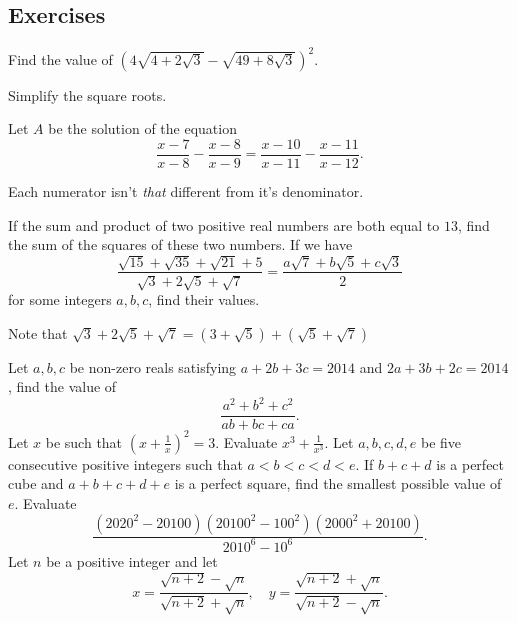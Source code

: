 \documentclass[../jarvis.tex]{subfiles}
\begin{document}
\subsection{Exercises}
\problem[2015 SMO(J) P9]Find the value of $\left(4\sqrt{4+2\sqrt{3}}-\sqrt{49+8\sqrt{3}}\right)^2.$
\begin{hints}
    \begin{hint}
        Simplify the square roots.
    \end{hint}
\end{hints}
\problem[2014 SMO(J) P13]Let $A$ be the solution of the equation
$$\frac{x-7}{x-8}-\frac{x-8}{x-9}=\frac{x-10}{x-11}-\frac{x-11}{x-12}.$$
\begin{hints}
    \begin{hint}
        Each numerator isn't \textit{that} different from it's denominator.
    \end{hint}
\end{hints}
\problem[2016 SMO(J) P11]If the sum and product of two positive real numbers are both equal to $13$, find the sum of the squares of these two numbers.
\problem[2022 SMO(J) P22]If we have $$\frac{\sqrt{15}+\sqrt{35}+\sqrt{21}+5}{\sqrt{3}+2\sqrt{5}+\sqrt{7}}=\frac{a\sqrt{7}+b\sqrt{5}+c\sqrt{3}}{2}$$ for some integers $a,b,c$, find their values.
\begin{hints}
    \begin{hint}
        Note that $\sqrt{3}+2\sqrt{5}+\sqrt{7}=(3+\sqrt{5})+(\sqrt{5}+\sqrt{7})$
    \end{hint}
\end{hints}
\problem[2014 SMO(J) P23]Let $a,b,c$ be non-zero reals satisfying $a+2b+3c=2014$ and $2a+3b+2c=2014$, find the value of 
$$\frac{a^2+b^2+c^2}{ab+bc+ca}.$$
\problem[2014 SMO(J) P26]Let $x$ be such that $\left(x+\frac{1}{x}\right)^2=3$. Evaluate $x^3+\frac{1}{x^3}.$
\problem[2014/15 SDML 2A/P5]Let $a,b,c,d,e$ be five consecutive positive integers such that $a<b<c<d<e$. If $b+c+d$ is a perfect cube and $a+b+c+d+e$ is a perfect square, find the smallest possible value of $e$.
\problem[2008 SMO(J) P23]Evaluate 
$$\frac{(2020^2-20100)(20100^2-100^2)(2000^2+20100)}{2010^6-10^6}.$$
\problem[2014 SMO(S) P23]Let $n$ be a positive integer and let
$$x=\frac{\sqrt{n+2}-\sqrt{n}}{\sqrt{n+2}+\sqrt{n}},\quad y=\frac{\sqrt{n+2}+\sqrt{n}}{\sqrt{n+2}-\sqrt{n}}.$$
\end{document}
